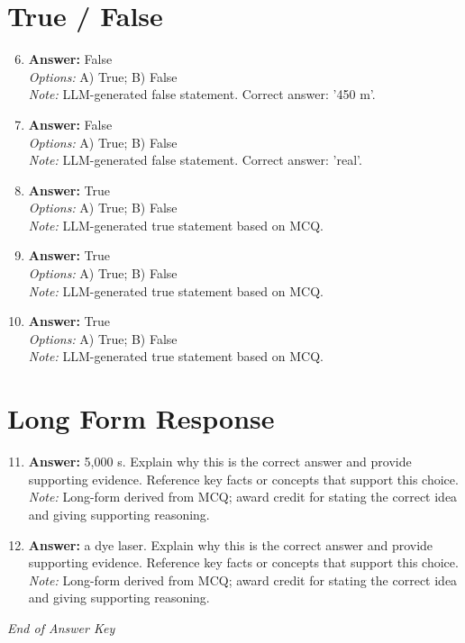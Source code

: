 \documentclass[12pt]{article}
\begin{document}
\section*{True / False}
\begin{enumerate}[label=\arabic*.]
\setcounter{enumi}{5}
\item \textbf{Answer:} False
\\ \textit{Options:} A) True; B) False
\\ \textit{Note:} LLM-generated false statement. Correct answer: '450 m'.
\item \textbf{Answer:} False
\\ \textit{Options:} A) True; B) False
\\ \textit{Note:} LLM-generated false statement. Correct answer: 'real'.
\item \textbf{Answer:} True
\\ \textit{Options:} A) True; B) False
\\ \textit{Note:} LLM-generated true statement based on MCQ.
\item \textbf{Answer:} True
\\ \textit{Options:} A) True; B) False
\\ \textit{Note:} LLM-generated true statement based on MCQ.
\item \textbf{Answer:} True
\\ \textit{Options:} A) True; B) False
\\ \textit{Note:} LLM-generated true statement based on MCQ.
\end{enumerate}

\section*{Long Form Response}
\begin{enumerate}[label=\arabic*.]
\setcounter{enumi}{10}
\item \textbf{Answer:} 5,000 s. Explain why this is the correct answer and provide supporting evidence. Reference key facts or concepts that support this choice.
\\ \textit{Note:} Long-form derived from MCQ; award credit for stating the correct idea and giving supporting reasoning.
\item \textbf{Answer:} a dye laser. Explain why this is the correct answer and provide supporting evidence. Reference key facts or concepts that support this choice.
\\ \textit{Note:} Long-form derived from MCQ; award credit for stating the correct idea and giving supporting reasoning.
\end{enumerate}

\vfill
\noindent\textit{End of Answer Key}
\end{document}
